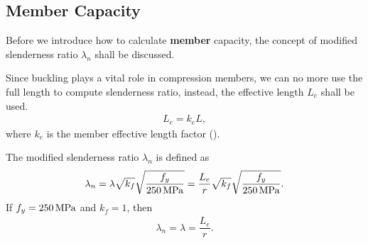 \subsection{Member Capacity}\label{sec:n_c}
Before we introduce how to calculate \textbf{member} capacity, the concept of modified slenderness ratio $\lambda_n$ shall be discussed.

Since buckling plays a vital role in compression members, we can no more use the full length to compute slenderness ratio, instead, the effective length $L_e$ shall be used.
\begin{gather}
L_e=k_eL,
\end{gather}
where $k_e$ is the member effective length factor ().

The modified slenderness ratio $\lambda_n$ is defined as
\begin{gather}
\lambda_n=\lambda\sqrt{k_f}\sqrt{\dfrac{f_y}{\SI{250}{\mega\pascal}}}=\dfrac{L_e}{r}\sqrt{k_f}\sqrt{\dfrac{f_y}{\SI{250}{\mega\pascal}}}.
\end{gather}
If $f_y=\SI{250}{\mega\pascal}$ and $k_f=1$, then
\begin{gather*}
\lambda_n=\lambda=\dfrac{L_e}{r}.
\end{gather*}

